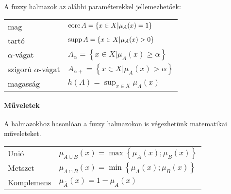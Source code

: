 \documentclass[../../main.tex]{subfiles}
\begin{document}
A fuzzy halmazok az alábbi paraméterekkel jellemezhetőek:
\begin{center}
  \begin{tabular}{l l}
    mag                    & $\operatorname{core} A = \left\{ x \in X | \mu_A(x) = 1 \right\}$          \\
    tartó                  & $\operatorname{supp} A = \left\{ x \in X | \mu_A(x) > 0 \right\}$          \\
    $\alpha$-vágat         & $A_\alpha = \left\{ x \in X | \mu_A(x) \geq \alpha \right\}$ \\
    szigorú $\alpha$-vágat & $A_{\alpha+} = \left\{ x \in X | \mu_A(x) > \alpha \right\}$ \\
    magasság               & $h(A) = \sup_{x \in X} \mu_A(x)$                             \\
  \end{tabular}
\end{center}

\paragraph{Műveletek}
A halmazokhoz hasonlóan a fuzzy halmazokon is végezhetünk matematikai
műveleteket.
\begin{center}
  \begin{tabular}{l l}
    Unió       & $\mu_{A \cup B}(x) = \max \left\{ \mu_A(x); \mu_B(x) \right\}$ \\
    Metszet    & $\mu_{A \cap B}(x) = \min \left\{ \mu_A(x); \mu_B(x) \right\}$ \\
    Komplemens & $\mu_{\overline A}(x) = 1 - \mu_A(x)$                          \\
  \end{tabular}
\end{center}
\end{document}
